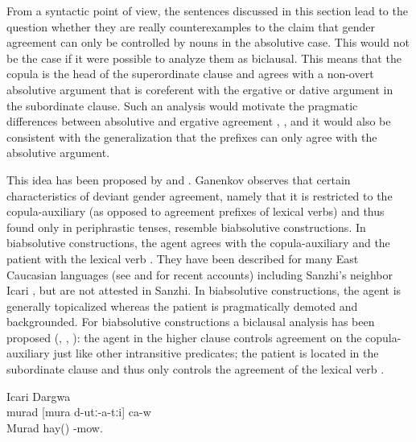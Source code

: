 From a syntactic point of view, the sentences discussed in this section lead to the question whether they are really counterexamples to the claim that gender agreement can only be controlled by nouns in the absolutive case. This would not be the case if it were possible to analyze them as biclausal. This means that the copula is the head of the superordinate clause and agrees with a non-overt absolutive argument that is coreferent with the ergative or dative argument in the subordinate clause. Such an analysis would motivate the pragmatic differences between absolutive and ergative agreement , , and it would also be consistent with the generalization that the prefixes can only agree with the absolutive argument. 

This idea has been proposed by \citet{Sumbatova2010} and \citet{GanenkovForthcoming}. Ganenkov observes that certain characteristics of deviant gender agreement, namely that it is restricted to the copula-auxiliary (as opposed to agreement prefixes of lexical verbs) and thus found only in periphrastic tenses, resemble biabsolutive constructions. In biabsolutive constructions, the agent agrees with the copula-auxiliary and the patient with the lexical verb . They have been described for many East Caucasian languages (see \citet{Forker2012a} and \citet{Gagliardietal.2014} for recent accounts) including Sanzhi's neighbor Icari \citet[156]{Sumbatova.Mutalov2003}, but are not attested in Sanzhi. In biabsolutive constructions, the agent is generally topicalized whereas the patient is pragmatically demoted and backgrounded. For biabsolutive constructions a biclausal analysis has been proposed (\citet{Kazenin1998}, \citet{Kazenin.Testelec1999}, \citet{Kazenin2001}): the agent in the higher clause controls agreement on the copula-auxiliary just like other intransitive predicates; the patient is located in the subordinate clause and thus only controls the agreement of the lexical verb .

\begin{exe}
	\ex	Icari Dargwa \citep[156]{Sumbatova.Mutalov2003} \\\label{ex:As to Murad, he is mowing hay.}
	\gll	murad	[mura	d-utː-a-tːi]	ca-w\\
		Murad	hay(\tsc{npl})	-mow.	\\
	\glt	{}
\end{exe}

